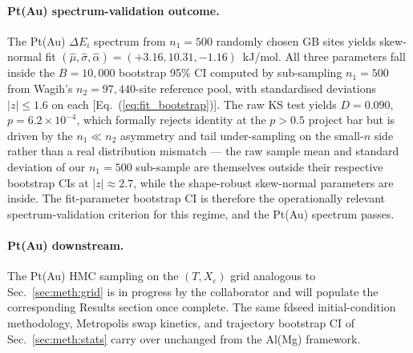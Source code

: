 \paragraph*{Pt(Au) spectrum-validation outcome.}
The Pt(Au) $\Delta E_i$ spectrum from $n_1 = 500$ randomly chosen GB
sites yields skew-normal fit $(\hat\mu, \hat\sigma, \hat\alpha) =
(+3.16, 10.31, -1.16)$~kJ/mol. All three parameters fall inside the
$B = 10{,}000$ bootstrap 95\% CI computed by sub-sampling
$n_1 = 500$ from Wagih's $n_2 = 97{,}440$-site reference pool, with
standardised deviations $|z| \le 1.6$ on each
[Eq.~(\ref{eq:fit_bootstrap})]. The raw KS test yields $D = 0.090$,
$p = 6.2 \times 10^{-4}$, which formally rejects identity at the
$p > 0.5$ project bar but is driven by the $n_1 \ll n_2$
asymmetry and tail under-sampling on the small-$n$ side rather than
a real distribution mismatch — the raw sample mean and standard
deviation of our $n_1 = 500$ sub-sample are themselves outside their
respective bootstrap CIs at $|z| \approx 2.7$, while the
shape-robust skew-normal parameters are inside. The fit-parameter
bootstrap CI is therefore the operationally relevant
spectrum-validation criterion for this regime, and the Pt(Au)
spectrum passes.

\paragraph*{Pt(Au) downstream.}
The Pt(Au) HMC sampling on the $(T, X_c)$ grid analogous to
Sec.~\ref{sec:meth:grid} is in progress by the collaborator and will
populate the corresponding Results section once complete. The same
fdseed initial-condition methodology, Metropolis swap kinetics, and
trajectory bootstrap CI of Sec.~\ref{sec:meth:stats} carry over
unchanged from the Al(Mg) framework.

